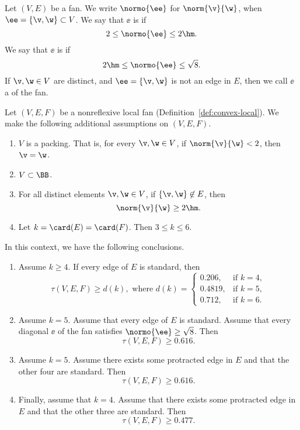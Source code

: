 \begin{definition} Let $(V,E)$ be a fan.  
We write $\normo{\ee}$ for $\norm{\v}{\w}$, when $\ee=\{\v,\w\}\subset V$.
We say that  $\ee$ is  if
\[
2\le \normo{\ee}\le2\hm.
\]
We say that  $\ee$ is  if
\[
2\hm\le \normo{\ee}\le\sqrt{8}.
\]
If $\v,\w\in V$ are distinct, and $\ee=\{\v,\w\}$ is not an edge in $E$, then
we call $\ee$ a  of the fan.
\end{definition}


\begin{theorem}\label{lemma:empty-d}
Let $(V,E,F)$ be a nonreflexive local fan (Definition~\ref{def:convex-local}).
We make the following additional
assumptions on $(V,E,F)$.
\begin{enumerate}
\item {} $V$ is a packing.  That is, for every $\v,\w\in
V$, if $\norm{\v}{\w}<2$, then $\v=\w$.
\item {} $V\subset \BB$.
\item {} For all distinct elements $\v,\w\in V$, if
$\{\v,\w\}\not\in E$, then 
\[ 
\norm{\v}{\w}\ge 2\hm.
\] 
\item {} 
Let   $k=\card(E)=\card(F)$.  Then $3\le k \le 6$.
\end{enumerate}
In this context, we have the following conclusions.
\begin{enumerate}
\item Assume $k\ge 4$.  If  every edge of $E$ is standard, then
\[ 
\tau(V,E,F) \ge d (k), \text{ where } d(k) =
\begin{cases}
  0.206,&\text{if }k=4,\\
  0.4819,&\text{if }k=5,\\
  0.712,&\text{if }k=6.
\end{cases}
\] 
\item Assume $k=5$.  Assume that every edge of $E$ is standard.
Assume that every diagonal $\ee$ of the fan satisfies $\normo{\ee}\ge\sqrt{8}$.
Then 
\[
\tau(V,E,F)\ge 0.616.
\]
\item Assume $k=5$.  Assume there exists some protracted edge in $E$ 
and that the other four are standard.  Then 
\[
\tau(V,E,F)\ge 0.616.
\]
\item Finally, assume that $k=4$.  Assume that there exists some protracted
 edge in $E$ and that the other three are standard.  Then
\[
\tau(V,E,F)\ge 0.477.
\]
\end{enumerate}
\end{theorem}

